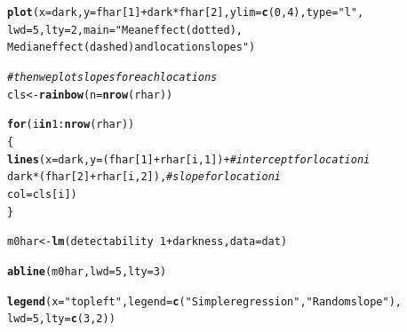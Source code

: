 \documentclass[12pt,a4paper]{scrartcl}\usepackage[]{graphicx}\usepackage[]{color}
\makeatletter
\newcommand{\hlnum}[1]{\textcolor[rgb]{0.686,0.059,0.569}{#1}}%
\newcommand{\hlstr}[1]{\textcolor[rgb]{0.192,0.494,0.8}{#1}}%
\newcommand{\hlcom}[1]{\textcolor[rgb]{0.678,0.584,0.686}{\textit{#1}}}%
\newcommand{\hlopt}[1]{\textcolor[rgb]{0,0,0}{#1}}%
\newcommand{\hlstd}[1]{\textcolor[rgb]{0.345,0.345,0.345}{#1}}%
\newcommand{\hlkwa}[1]{\textcolor[rgb]{0.161,0.373,0.58}{\textbf{#1}}}%
\newcommand{\hlkwb}[1]{\textcolor[rgb]{0.69,0.353,0.396}{#1}}%
\newcommand{\hlkwc}[1]{\textcolor[rgb]{0.333,0.667,0.333}{#1}}%
\newcommand{\hlkwd}[1]{\textcolor[rgb]{0.737,0.353,0.396}{\textbf{#1}}}%
\newenvironment{kframe}{%
 \def\at@end@of@kframe{}%
 \ifinner\ifhmode%
  \def\at@end@of@kframe{\end{minipage}}%
  \begin{minipage}{\columnwidth}%
 \fi\fi%
 \def\FrameCommand##1{\hskip\@totalleftmargin \hskip-\fboxsep
 \colorbox{shadecolor}{##1}\hskip-\fboxsep
     \hskip-\linewidth \hskip-\@totalleftmargin \hskip\columnwidth}%
 \MakeFramed {\advance\hsize-\width
   \@totalleftmargin\z@ \linewidth\hsize
   \@setminipage}}%
 {\par\unskip\endMakeFramed%
 \at@end@of@kframe}
\newenvironment{knitrout}{}{} %
\makeatother
\begin{document}
\begin{Answer}
\begin{knitrout}
\begin{kframe}
\begin{alltt}
\hlkwd{plot}\hlstd{(}\hlkwc{x}\hlstd{=dark,} \hlkwc{y}\hlstd{=fhar[}\hlnum{1}\hlstd{]}\hlopt{+}\hlstd{dark}\hlopt{*}\hlstd{fhar[}\hlnum{2}\hlstd{],} \hlkwc{ylim}\hlstd{=}\hlkwd{c}\hlstd{(}\hlnum{0}\hlstd{,}\hlnum{4}\hlstd{),} \hlkwc{type}\hlstd{=}\hlstr{"l"}\hlstd{,}
     \hlkwc{lwd}\hlstd{=}\hlnum{5}\hlstd{,} \hlkwc{lty}\hlstd{=}\hlnum{2}\hlstd{,} \hlkwc{main}\hlstd{=}\hlstr{"Mean effect (dotted),
     Median effect (dashed) and location slopes"}\hlstd{)}
\end{alltt}


{\ttfamily\noindent\bfseries\color{errorcolor}{\#\# Error in plot(x = dark, y = fhar[1] + dark * fhar[2], ylim = c(0, 4), : object 'dark' not found}}\begin{alltt}
\hlcom{#then we plot slopes for each locations}
\hlstd{cls} \hlkwb{<-} \hlkwd{rainbow}\hlstd{(}\hlkwc{n} \hlstd{=} \hlkwd{nrow}\hlstd{(rhar))}
\end{alltt}


{\ttfamily\noindent\bfseries\color{errorcolor}{\#\# Error in nrow(rhar): object 'rhar' not found}}\begin{alltt}
\hlkwa{for}\hlstd{(i} \hlkwa{in} \hlnum{1}\hlopt{:}\hlkwd{nrow}\hlstd{(rhar))}
\hlstd{\{}
  \hlkwd{lines}\hlstd{(}\hlkwc{x}\hlstd{=dark,} \hlkwc{y}\hlstd{=(fhar[}\hlnum{1}\hlstd{]}\hlopt{+}\hlstd{rhar[i,}\hlnum{1}\hlstd{])}\hlopt{+}\hlcom{#intercept for location i}
          \hlstd{dark}\hlopt{*}\hlstd{(fhar[}\hlnum{2}\hlstd{]}\hlopt{+}\hlstd{rhar[i,}\hlnum{2}\hlstd{]),}\hlcom{# slope for location i}
    \hlkwc{col}\hlstd{=cls[i])}
\hlstd{\}}
\end{alltt}


{\ttfamily\noindent\bfseries\color{errorcolor}{\#\# Error in nrow(rhar): object 'rhar' not found}}\begin{alltt}
\hlstd{m0har} \hlkwb{<-} \hlkwd{lm}\hlstd{(detectability} \hlopt{~} \hlnum{1} \hlopt{+} \hlstd{darkness,} \hlkwc{data} \hlstd{= dat)}
\end{alltt}


{\ttfamily\noindent\bfseries\color{errorcolor}{\#\# Error in is.data.frame(data): object 'dat' not found}}\begin{alltt}
\hlkwd{abline}\hlstd{(m0har,} \hlkwc{lwd}\hlstd{=}\hlnum{5}\hlstd{,} \hlkwc{lty}\hlstd{=}\hlnum{3}\hlstd{)}
\end{alltt}


{\ttfamily\noindent\bfseries\color{errorcolor}{\#\# Error in abline(m0har, lwd = 5, lty = 3): object 'm0har' not found}}\begin{alltt}
\hlkwd{legend}\hlstd{(}\hlkwc{x} \hlstd{=} \hlstr{"topleft"}\hlstd{,} \hlkwc{legend} \hlstd{=} \hlkwd{c}\hlstd{(}\hlstr{"Simple regression"}\hlstd{,} \hlstr{"Random slope"}\hlstd{),}
       \hlkwc{lwd}\hlstd{=}\hlnum{5}\hlstd{,} \hlkwc{lty} \hlstd{=} \hlkwd{c}\hlstd{(}\hlnum{3}\hlstd{,}\hlnum{2}\hlstd{))}
\end{alltt}



\end{kframe}
\end{knitrout}
\end{Answer}
\end{document}
